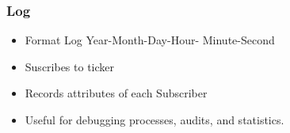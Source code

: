 \documentclass{beamer}
\begin{document}
\begin{frame}
\frametitle{Log}
\begin{itemize}
\item Format Log Year-Month-Day-Hour- Minute-Second
\item Suscribes to ticker
\item Records attributes of each Subscriber
\item Useful for debugging processes, audits, and statistics.
\end{itemize}

\begin{center}
\end{center}

\end{frame}
\end{document}
